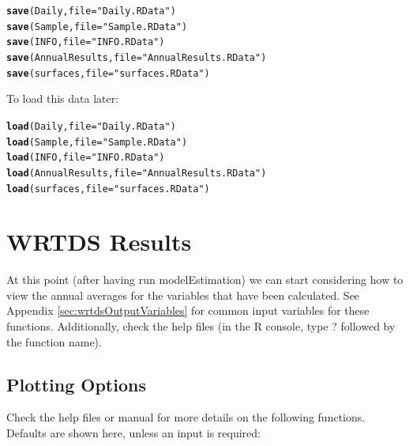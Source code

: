 \documentclass[a4paper,11pt]{article}\usepackage{graphicx, color}
\makeatletter
\newcommand{\hlfunctioncall}[1]{\textcolor[rgb]{0.501960784313725,0,0.329411764705882}{\textbf{#1}}}%
\newcommand{\hlstring}[1]{\textcolor[rgb]{0.6,0.6,1}{#1}}%
\newenvironment{kframe}{%
 \def\at@end@of@kframe{}%
 \ifinner\ifhmode%
  \def\at@end@of@kframe{\end{minipage}}%
  \begin{minipage}{\columnwidth}%
 \fi\fi%
 \def\FrameCommand##1{\hskip\@totalleftmargin \hskip-\fboxsep
 \colorbox{shadecolor}{##1}\hskip-\fboxsep
     \hskip-\linewidth \hskip-\@totalleftmargin \hskip\columnwidth}%
 \MakeFramed {\advance\hsize-\width
   \@totalleftmargin\z@ \linewidth\hsize
   \@setminipage}}%
 {\par\unskip\endMakeFramed%
 \at@end@of@kframe}
\newenvironment{knitrout}{}{} %
\makeatother
\begin{document}
\begin{knitrout}
\color{fgcolor}\begin{kframe}
\begin{alltt}
\hlfunctioncall{save}(Daily, file=\hlstring{"Daily.RData"})
\hlfunctioncall{save}(Sample, file=\hlstring{"Sample.RData"})
\hlfunctioncall{save}(INFO, file=\hlstring{"INFO.RData"})
\hlfunctioncall{save}(AnnualResults, file=\hlstring{"AnnualResults.RData"})
\hlfunctioncall{save}(surfaces, file=\hlstring{"surfaces.RData"})
\end{alltt}
\end{kframe}
\end{knitrout}


To load this data later:
\begin{knitrout}
\color{fgcolor}\begin{kframe}
\begin{alltt}
\hlfunctioncall{load}(Daily, file=\hlstring{"Daily.RData"})
\hlfunctioncall{load}(Sample, file=\hlstring{"Sample.RData"})
\hlfunctioncall{load}(INFO, file=\hlstring{"INFO.RData"})
\hlfunctioncall{load}(AnnualResults, file=\hlstring{"AnnualResults.RData"})
\hlfunctioncall{load}(surfaces, file=\hlstring{"surfaces.RData"})
\end{alltt}
\end{kframe}
\end{knitrout}



\FloatBarrier

\section{WRTDS Results}
\label{sec:wrtdsResults}
At this point (after having run modelEstimation) we can start considering how to view the annual averages for the variables that have been calculated.  See Appendix \ref{sec:wrtdsOutputVariables} for common input variables for these functions. Additionally, check the help files (in the R console, type ? followed by the function name).

\subsection{Plotting Options}
\label{sec:wrtdsPlotting}
Check the help files or manual for more details on the following functions.  Defaults are shown here, unless an input is required:
\end{document}
